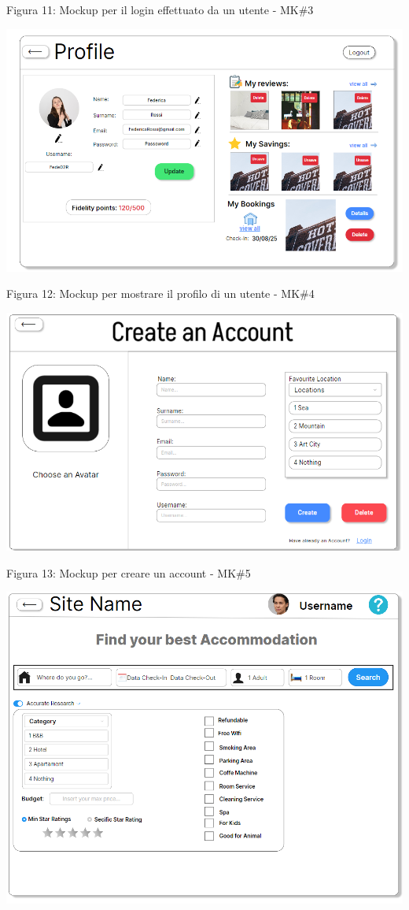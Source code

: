\documentclass[10pt]{article}
\begin{document}
\begin{center}
\par\medskip
Figura 11: Mockup per il login effettuato da un utente - MK\#3
\par\medskip
\includegraphics[scale=0.6]{Mockup/MockupProfile}
\par\medskip
Figura 12: Mockup per mostrare il profilo di un utente - MK\#4
\par\medskip
\includegraphics[scale=0.6]{Mockup/MockupRegister}
\par\medskip
\par\medskip
Figura 13: Mockup per creare un account - MK\#5
\par\medskip
\par\medskip
\includegraphics[scale=0.6]{Mockup/MockupResearch}

\end{center}
\end{document}
